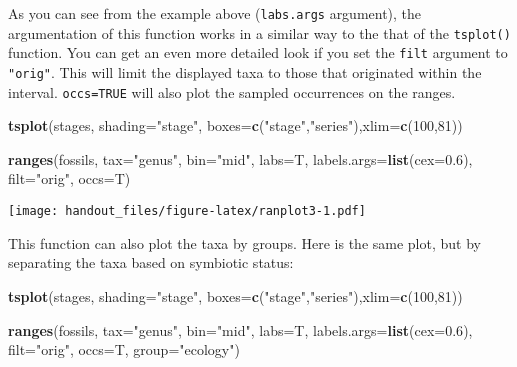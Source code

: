 \documentclass[]{article}
\newenvironment{Shaded}{\begin{snugshade}}{\end{snugshade}}
\newcommand{\KeywordTok}[1]{\textcolor[rgb]{0.13,0.29,0.53}{\textbf{{#1}}}}
\newcommand{\DataTypeTok}[1]{\textcolor[rgb]{0.13,0.29,0.53}{{#1}}}
\newcommand{\DecValTok}[1]{\textcolor[rgb]{0.00,0.00,0.81}{{#1}}}
\newcommand{\FloatTok}[1]{\textcolor[rgb]{0.00,0.00,0.81}{{#1}}}
\newcommand{\StringTok}[1]{\textcolor[rgb]{0.31,0.60,0.02}{{#1}}}
\newcommand{\NormalTok}[1]{{#1}}
\begin{document}
As you can see from the example above (\texttt{labs.args} argument), the
argumentation of this function works in a similar way to the that of the
\texttt{tsplot()} function. You can get an even more detailed look if
you set the \texttt{filt} argument to \texttt{"orig"}. This will limit
the displayed taxa to those that originated within the interval.
\texttt{occs=TRUE} will also plot the sampled occurrences on the ranges.

\begin{Shaded}
\begin{Highlighting}[]
\KeywordTok{tsplot}\NormalTok{(stages, }\DataTypeTok{shading=}\StringTok{"stage"}\NormalTok{, }\DataTypeTok{boxes=}\KeywordTok{c}\NormalTok{(}\StringTok{"stage"}\NormalTok{,}\StringTok{"series"}\NormalTok{),}\DataTypeTok{xlim=}\KeywordTok{c}\NormalTok{(}\DecValTok{100}\NormalTok{,}\DecValTok{81}\NormalTok{))}

\KeywordTok{ranges}\NormalTok{(fossils, }\DataTypeTok{tax=}\StringTok{"genus"}\NormalTok{, }\DataTypeTok{bin=}\StringTok{"mid"}\NormalTok{, }\DataTypeTok{labs=}\NormalTok{T, }
  \DataTypeTok{labels.args=}\KeywordTok{list}\NormalTok{(}\DataTypeTok{cex=}\FloatTok{0.6}\NormalTok{), }\DataTypeTok{filt=}\StringTok{"orig"}\NormalTok{, }\DataTypeTok{occs=}\NormalTok{T)}
\end{Highlighting}
\end{Shaded}

\texttt{[image: handout\_files/figure-latex/ranplot3-1.pdf]}

This function can also plot the taxa by groups. Here is the same plot,
but by separating the taxa based on symbiotic status:

\begin{Shaded}
\begin{Highlighting}[]
\KeywordTok{tsplot}\NormalTok{(stages, }\DataTypeTok{shading=}\StringTok{"stage"}\NormalTok{, }\DataTypeTok{boxes=}\KeywordTok{c}\NormalTok{(}\StringTok{"stage"}\NormalTok{,}\StringTok{"series"}\NormalTok{),}\DataTypeTok{xlim=}\KeywordTok{c}\NormalTok{(}\DecValTok{100}\NormalTok{,}\DecValTok{81}\NormalTok{))}

\KeywordTok{ranges}\NormalTok{(fossils, }\DataTypeTok{tax=}\StringTok{"genus"}\NormalTok{, }\DataTypeTok{bin=}\StringTok{"mid"}\NormalTok{, }\DataTypeTok{labs=}\NormalTok{T, }
  \DataTypeTok{labels.args=}\KeywordTok{list}\NormalTok{(}\DataTypeTok{cex=}\FloatTok{0.6}\NormalTok{), }\DataTypeTok{filt=}\StringTok{"orig"}\NormalTok{, }\DataTypeTok{occs=}\NormalTok{T, }\DataTypeTok{group=}\StringTok{"ecology"}\NormalTok{)}
\end{Highlighting}
\end{Shaded}
\end{document}
